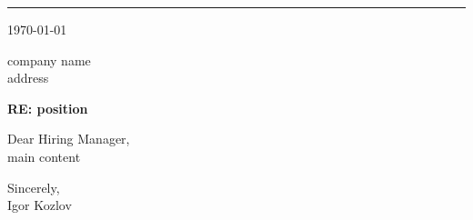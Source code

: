\documentclass{ik-coverletter}
\begin{document}
\thispagestyle{empty}



\noindent\rule{\textwidth}{1pt}

\vspace{2em}

\noindent\today\bigskip


\noindent company name\\
address\bigskip

\vspace{3em}

\noindent\textbf{RE: position}

\vspace{2em}

\noindent Dear Hiring Manager,\\

\noindent main content\\

\vspace{2em}

\noindent Sincerely,\\

\noindent Igor Kozlov
\end{document}
